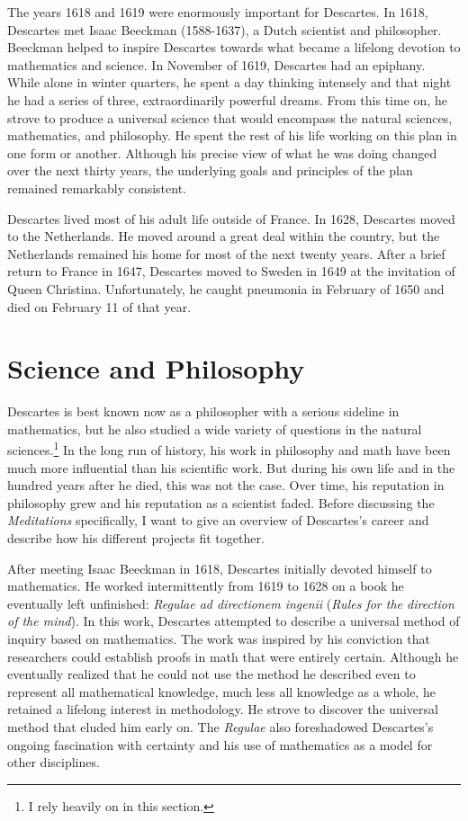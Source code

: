 The years 1618 and 1619 were enormously important for Descartes. In 1618, Descartes met Isaac Beeckman (1588-1637), a Dutch scientist and philosopher. Beeckman helped to inspire Descartes towards what became a lifelong devotion to mathematics and science. In November of 1619, Descartes had an epiphany. While alone in winter quarters, he spent a day thinking intensely and that night he had a series of three, extraordinarily powerful dreams. From this time on, he strove to produce a universal science that would encompass the natural sciences, mathematics, and philosophy. He spent the rest of his life working on this plan in one form or another. Although his precise view of what he was doing changed over the next thirty years, the underlying goals and principles of the plan remained remarkably consistent.

Descartes lived most of his adult life outside of France. In 1628, Descartes moved to the Netherlands. He moved around a great deal within the country, but the Netherlands remained his home for most of the next twenty years. After a brief return to France in 1647, Descartes moved to Sweden in 1649 at the invitation of Queen Christina. Unfortunately, he caught pneumonia in February of 1650 and died on February 11 of that year.

\section{Science and Philosophy}

Descartes is best known now as a philosopher with a serious sideline in mathematics, but he also studied a wide variety of questions in the natural sciences.\footnote{I rely heavily on \textcite{gaukroger2011} in this section.} In the long run of history, his work in philosophy and math have been much more influential than his scientific work. But during his own life and in the hundred years after he died, this was not the case. Over time, his reputation in philosophy grew and his reputation as a scientist faded. Before discussing the \textit{Meditations} specifically, I want to give an overview of Descartes's career and describe how his different projects fit together.

After meeting Isaac Beeckman in 1618, Descartes initially devoted himself to mathematics. He worked intermittently from 1619 to 1628 on a book he eventually left unfinished: \textit{Regulae ad directionem ingenii} (\textit{Rules for the direction of the mind}). In this work, Descartes attempted to describe a universal method of inquiry based on mathematics. The work was inspired by his conviction that researchers could establish proofs in math that were entirely certain. Although he eventually realized that he could not use the method he described even to represent all mathematical knowledge, much less all knowledge as a whole, he retained a lifelong interest in methodology. He strove to discover the universal method that eluded him early on. The \textit{Regulae} also foreshadowed Descartes's ongoing fascination with certainty and his use of mathematics as a model for other disciplines.

